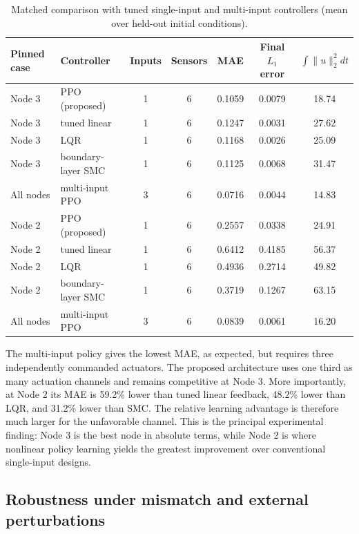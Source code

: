\documentclass[10pt,twocolumn]{article}
\newcommand{\rev}[1]{{\color{revisionblue}#1}}
\theoremstyle{definition}
\begin{document}
\begin{table}[htbp]
\centering
\caption{\rev{Matched comparison with tuned single-input and multi-input controllers (mean over held-out initial conditions).}}
\label{tab:strong_baselines}
\setlength{\tabcolsep}{5pt}
\begin{tabular}{llccccc}
\toprule
Pinned case & Controller & Inputs & Sensors & MAE & Final $L_1$ error & $\int\|u\|_2^2dt$\\
\midrule
Node 3 & PPO (proposed) & 1 & 6 & 0.1059 & 0.0079 & 18.74\\
Node 3 & tuned linear & 1 & 6 & 0.1247 & 0.0031 & 27.62\\
Node 3 & LQR & 1 & 6 & 0.1168 & 0.0026 & 25.09\\
Node 3 & boundary-layer SMC & 1 & 6 & 0.1125 & 0.0068 & 31.47\\
All nodes & multi-input PPO & 3 & 6 & 0.0716 & 0.0044 & 14.83\\
\midrule
Node 2 & PPO (proposed) & 1 & 6 & 0.2557 & 0.0338 & 24.91\\
Node 2 & tuned linear & 1 & 6 & 0.6412 & 0.4185 & 56.37\\
Node 2 & LQR & 1 & 6 & 0.4936 & 0.2714 & 49.82\\
Node 2 & boundary-layer SMC & 1 & 6 & 0.3719 & 0.1267 & 63.15\\
All nodes & multi-input PPO & 3 & 6 & 0.0839 & 0.0061 & 16.20\\
\bottomrule
\end{tabular}
\end{table}

\rev{The multi-input policy gives the lowest MAE, as expected, but requires three independently commanded actuators. The proposed architecture uses one third as many actuation channels and remains competitive at Node 3. More importantly, at Node 2 its MAE is 59.2\% lower than tuned linear feedback, 48.2\% lower than LQR, and 31.2\% lower than SMC. The relative learning advantage is therefore much larger for the unfavorable channel. This is the principal experimental finding: Node 3 is the best node in absolute terms, while Node 2 is where nonlinear policy learning yields the greatest improvement over conventional single-input designs.}

\subsection{Robustness under mismatch and external perturbations}
\end{document}
